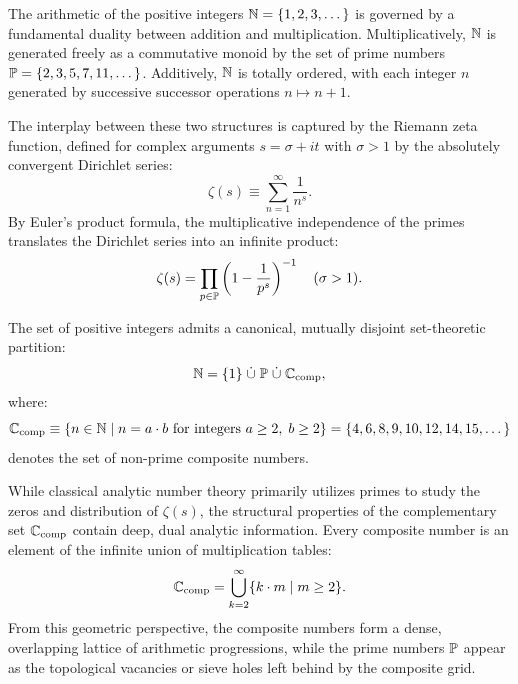 The arithmetic of the positive integers $\mathbb{N} = \{1, 2, 3, \dots\}$ is governed by a fundamental duality between addition and multiplication. Multiplicatively, $\mathbb{N}$ is generated freely as a commutative monoid by the set of prime numbers $\mathbb{P} = \{2, 3, 5, 7, 11, \dots\}$. Additively, $\mathbb{N}$ is totally ordered, with each integer $n$ generated by successive successor operations $n \mapsto n + 1$. 

The interplay between these two structures is captured by the Riemann zeta function, defined for complex arguments $s = \sigma + i t$ with $\sigma > 1$ by the absolutely convergent Dirichlet series:
\begin{equation}
\label{eq:zeta_def}
\zeta(s) \equiv \sum_{n=1}^\infty \frac{1}{n^s}.
\end{equation}
By Euler's product formula, the multiplicative independence of the primes translates the Dirichlet series into an infinite product:
\begin{equation}
\label{eq:euler_product}
\zeta(s) = \prod_{p \in \mathbb{P}} \left(1 - \frac{1}{p^s}\right)^{-1} \quad (\sigma > 1).
\end{equation}

\begin{definition}
\label{def:composite_set}
The set of positive integers admits a canonical, mutually disjoint set-theoretic partition:
\begin{equation}
\label{eq:fundamental_partition}
\mathbb{N} = \{1\} \;\dot{\cup}\; \mathbb{P} \;\dot{\cup}\; \mathbb{C}_{\mathrm{comp}},
\end{equation}
where:
\begin{equation}
\label{eq:composite_set_def}
\mathbb{C}_{\mathrm{comp}} \equiv \{n \in \mathbb{N} \mid n = a \cdot b \text{ for integers } a \ge 2, \; b \ge 2\} = \{4, 6, 8, 9, 10, 12, 14, 15, \dots\}
\end{equation}
denotes the set of non-prime composite numbers.
\end{definition}

While classical analytic number theory primarily utilizes primes to study the zeros and distribution of $\zeta(s)$, the structural properties of the complementary set $\mathbb{C}_{\mathrm{comp}}$ contain deep, dual analytic information. Every composite number is an element of the infinite union of multiplication tables:
\begin{equation}
\mathbb{C}_{\mathrm{comp}} = \bigcup_{k=2}^\infty \{k \cdot m \mid m \ge 2\}.
\end{equation}
From this geometric perspective, the composite numbers form a dense, overlapping lattice of arithmetic progressions, while the prime numbers $\mathbb{P}$ appear as the topological vacancies or sieve holes left behind by the composite grid.

